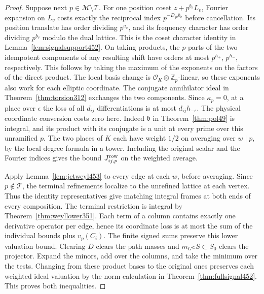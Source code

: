 \documentclass[a4paper,11pt]{article}
\theoremstyle{definition}
\theoremstyle{remark}
\numberwithin{equation}{section}
\begin{document}
\begin{proof}
Suppose next \(p\in\mathcal M\setminus\mathcal T\). For one
position coset \(z+p^{b_v}L_v\), Fourier expansion on \(L_v\)
costs exactly the reciprocal index \(p^{-D_{jv}b_v}\) before
cancellation. Its position translate has order dividing
\(p^{a_v}\), and its frequency character has order dividing
\(p^{b_v}\) modulo the dual lattice. This is the coset character
identity in Lemma~\ref{lem:signalsupport452}. On taking products,
the \(p\)-parts of the two idempotent components of any resulting
shift have orders at most \(p^{h_+}\), \(p^{h_-}\), respectively.
This follows by taking the maximum of the exponents on the
factors of the direct product. The local basis change is
\(\mathcal O_K\otimes\mathbb Z_p\)-linear, so these exponents
also work for each elliptic coordinate. The conjugate
annihilator ideal in Theorem~\ref{thm:torsion312} exchanges
the two components. Since \(\kappa_p=0\), at a place over
\(\epsilon\) the loss of all \(d_{ij}\) differentiations is
at most \(d_{ij}h_{-\epsilon}\). The physical coordinate
conversion costs zero here. Indeed \(\mathfrak b\) in
Theorem~\ref{thm:pol49} is integral, and its product with its
conjugate is a unit at every prime over this unramified \(p\).
The two places of \(K\) each have weight \(1/2\) on averaging
over \(w\mid p\), by the local degree formula in a tower.
Including the original scalar and the Fourier indices gives
the bound \(J_{ij,p}^{\rm row}\) on the weighted average.

Apply Lemma~\ref{lem:jetweyl453} to every edge at each \(w\),
before averaging. Since \(p\notin\mathcal T\), the terminal
refinements localize to the unrefined lattice at each vertex.
Thus the identity representatives give matching integral
frames at both ends of every composition. The terminal
restriction is integral by Theorem~\ref{thm:weyllower351}.
Each term of a column contains exactly one derivative operator
per edge, hence its coordinate loss is at most the sum of the
individual bounds plus \(v_p(C_i)\). The finite signed sums
preserve this lower valuation bound. Clearing \(D\) clears
the path masses and \(m_G eS\subset S_0\) clears the projector.
Expand the minors, add over the columns, and take the minimum
over the tests. Changing from these product bases to the original
ones preserves each weighted ideal valuation by the norm
calculation in Theorem~\ref{thm:fullsignal452}. This proves
both inequalities.
\end{proof}
\end{document}
